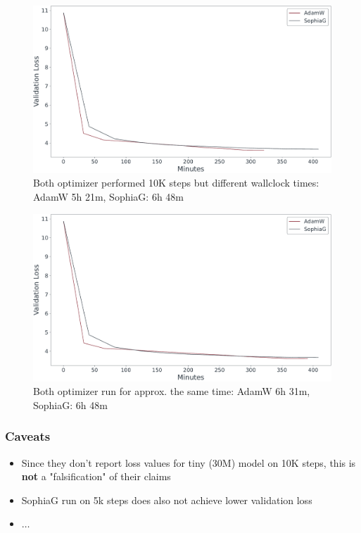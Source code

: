 \documentclass[
	11pt, %
	aspectratio=169, %
]{beamer}
\begin{document}
\begin{frame}[plain] %

	\begin{figure}
		\includegraphics[width=12cm]{../results/time_adam_sophia.pdf}
		\caption*{Both optimizer performed 10K steps but different wallclock times: AdamW 5h 21m, SophiaG: 6h 48m}
	\end{figure}
\end{frame}
\begin{frame}{} %

	\begin{figure}
		\includegraphics[width=12cm]{../results/time_adam_long_sophia.pdf}
		\caption*{Both optimizer run for approx. the same time: AdamW 6h 31m, SophiaG: 6h 48m}
	\end{figure}
\end{frame}

 \begin{frame}
 \frametitle{Caveats}
 \begin{itemize}
	\item Since they don't report loss values for tiny (30M) model on 10K steps, this is \textbf{not} a "falsification" of their claims
	\item SophiaG run on 5k steps does also not achieve lower validation loss
	\item $\dots$
 \end{itemize}
\end{frame}
\end{document}
